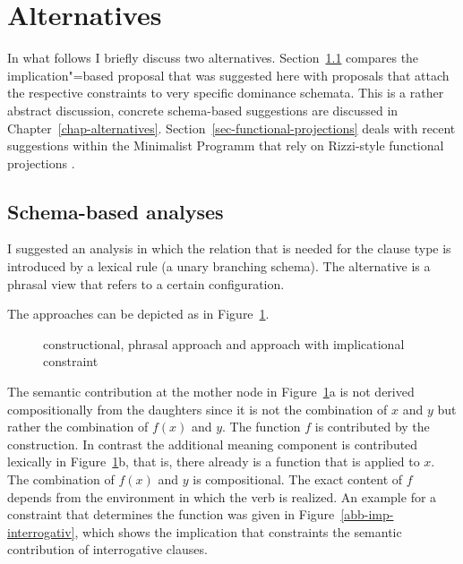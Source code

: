 \section{Alternatives}

In what follows I briefly discuss two alternatives. Section~\ref{sec-schema-based-ct} compares the
implication"=based proposal that was suggested here with proposals that attach the respective
constraints to very specific dominance schemata. This is a rather abstract discussion, concrete schema-based
suggestions are discussed in Chapter~\ref{chap-alternatives}.
Section~\ref{sec-functional-projections} deals with recent suggestions within the Minimalist
Programm that rely on Rizzi-style functional projections \citep{Rizzi97a-u}.

\subsection{Schema-based analyses}
\label{sec-schema-based-ct}

I suggested an analysis in which the relation that is needed for the clause type is introduced by a
lexical rule (a unary branching schema). The alternative is a phrasal view that refers to a certain configuration.

The approaches can be depicted as in Figure~\ref{abb-konstruktion-implikation}.
\begin{figure}
\hfill
\hfill
{}\hfill\mbox{}
\caption{\label{abb-konstruktion-implikation}constructional, phrasal approach and approach with
  implicational constraint}
\end{figure}%
The semantic contribution at the mother node in Figure~\ref{abb-konstruktion-implikation}a is not
derived compositionally from the daughters since it is not the combination of $x$ and $y$ but rather
the combination of $f(x)$ and $y$. The function $f$ is contributed by the construction. In contrast
the additional meaning component is contributed lexically in
Figure~\ref{abb-konstruktion-implikation}b, that is, there already is a function that is applied to
$x$. The combination of $f(x)$ and $y$ is compositional. The exact content of $f$ depends from the
environment in which the verb is realized. An example for a constraint that determines the function
was given in Figure~\ref{abb-imp-interrogativ}, which shows the implication that constraints the
semantic contribution of interrogative clauses.





